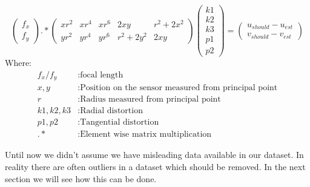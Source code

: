\documentclass[11pt,a4paper,titlepage,oneside]{report}
\begin{document}
\begin{equation}\label{eq:distortion_lin}
	\begin{pmatrix}
		f_x\\
		f_y
	\end{pmatrix}.*
	\begin{pmatrix}
		xr^2 & xr^4 & xr^6 & 2xy & r^2+2x^2 \\
		yr^2 & yr^4 & yr^6 & r^2+2y^2 & 2xy
	\end{pmatrix}
	\begin{pmatrix}
		k1\\k2\\k3\\p1\\p2
	\end{pmatrix}=
	\begin{pmatrix}
		u_{should}-u_{est}\\
		v_{should}-v_{est}
	\end{pmatrix}
\end{equation}
Where:
\begin{align*}
  f_x/f_y		&: \text{focal length}\\
	x,y				&: \text{Position on the sensor measured from principal point}\\
	r					&: \text{Radius measured from principal point}\\
	k1,k2,k3	&: \text{Radial distortion}\\
	p1,p2			&: \text{Tangential distortion}\\
	.*				&: \text{Element wise matrix multiplication}
\end{align*}

Until now we didn't assume we have misleading data available in our dataset. In reality there are often outliers in a dataset which should be removed. In the next section we will see how this can be done.
\end{document}
